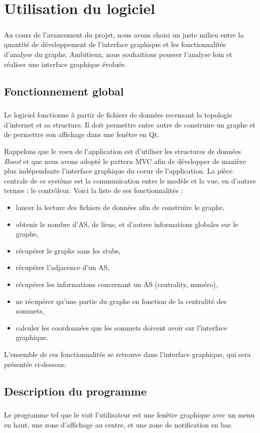 \section{Utilisation du logiciel}
\subparagraph{}
Au cours de l'avancement du projet, nous avons choisi un juste milieu entre la quantit\'e de d\'eveloppement de l'interface graphique et les fonctionnalit\'es d'analyse du graphe. Ambitieux, nous souhaitions pousser l'analyse loin et réaliser une interface graphique évoluée.

\subsection{Fonctionnement global}
\subparagraph{}
Le logiciel fonctionne \`a partir de fichiers de données recensant la topologie d'internet et sa structure. Il doit permettre entre autre de construire un graphe et de permettre son affichage dans une fenêtre en Qt.

Rappelons que le voeu de l'application est d'utiliser les structures de donn\'ees \textit{Boost} et que nous avons adopté le pattern MVC afin de développer de manière plus ind\'ependante l'interface graphique du coeur de l'application. La pi\`ece centrale de ce système est la communication entre le modèle et la vue, en d'autres termes : le contrôleur. Voici la liste de ses fonctionnalités :
\begin{itemize}
 \item lancer la lecture des fichiers de données afin de construire le graphe,
\item obtenir le nombre d'AS, de liens, et d'autres informations globales sur le graphe,
\item récupérer le graphe sans les stubs,
\item récupérer l'adjacence d'un AS,
\item récupérer les informations concernant un AS (centrality, numéro),
\item ne récupérer qu'une partie du graphe en fonction de la centralité des sommets,
\item calculer les coordonnées que les sommets doivent avoir sur l'interface graphique.
\end{itemize}

L'ensemble de ces fonctionnalités se retrouve dans l'interface graphique, qui sera présentée ci-dessous.

\subsection{Description du programme}
\subparagraph{}
Le programme tel que le voit l'utilisateur est une fen\^etre graphique avec un menu en haut, une zone d'affichage au centre, et une zone de notification en bas.

